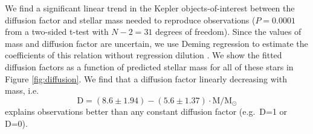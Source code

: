 \documentclass[twocolumn,twocolappendix]{aastex6}
\begin{document}
We find a significant linear trend in the Kepler objects-of-interest between the diffusion factor and stellar mass needed to reproduce observations ($P = 0.0001$ from a two-sided t-test with $N-2=31$ degrees of freedom). Since the values of mass and diffusion factor are uncertain, we use Deming regression to estimate the coefficients of this relation without regression dilution \citep{deming1943statistical}. We show the fitted diffusion factors as a function of predicted stellar mass for all of these stars in Figure \ref{fig:diffusion}. We find that a diffusion factor linearly decreasing with mass, i.e.\ 
\begin{equation} \label{eq:diffusion}
    \text{D} = ( 8.6 \pm 1.94 ) - ( 5.6 \pm 1.37 ) \cdot \text{M}/\text{M}_\odot
\end{equation}
explains observations better than any constant diffusion factor (e.g.\ D=1 or D=0). 
\end{document}
